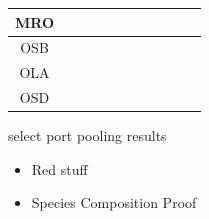 \documentclass[ xcolor = pdftex, dvipsnames, table ]{beamer}
\begin{document}
\begin{frame}
{\begin{tabular}{|c|c|c|c|c|c|c|c|c|c|c|}
        MRO&\cellcolor[HTML]{984EA3}&\cellcolor[HTML]{984EA3}&\cellcolor[HTML]{984EA3}&\cellcolor[HTML]{984EA3}&\cellcolor[HTML]{984EA3}&\cellcolor[HTML]{984EA3}&\cellcolor[HTML]{984EA3}&\cellcolor[HTML]{FF7F00}&\cellcolor[HTML]{984EA3}&\cellcolor[HTML]{984EA3} \\ \hline%
        OSB&\cellcolor[HTML]{FF7F00}&\cellcolor[HTML]{FF7F00}&\cellcolor[HTML]{FF7F00}&\cellcolor[HTML]{FF7F00}&\cellcolor[HTML]{FF7F00}&\cellcolor[HTML]{FF7F00}&\cellcolor[HTML]{FF7F00}&\cellcolor[HTML]{FF7F00}&\cellcolor[HTML]{984EA3}&\cellcolor[HTML]{FF7F00} \\ \hline%
        OLA&\cellcolor[HTML]{FF7F00}&\cellcolor[HTML]{FFFF33}&\cellcolor[HTML]{FF7F00}&\cellcolor[HTML]{FFFF33}&\cellcolor[HTML]{FF7F00}&\cellcolor[HTML]{FFFF33}&\cellcolor[HTML]{FFFF33}&\cellcolor[HTML]{FFFF33}&\cellcolor[HTML]{FF7F00}&\cellcolor[HTML]{FF7F00} \\ \hline%
        OSD&\cellcolor[HTML]{FF7F00}&\cellcolor[HTML]{FFFF33}&\cellcolor[HTML]{FFFF33}&\cellcolor[HTML]{A65628}&\cellcolor[HTML]{FFFF33}&\cellcolor[HTML]{FFFF33}&\cellcolor[HTML]{A65628}&\cellcolor[HTML]{FFFF33}&\cellcolor[HTML]{FFFF33}&\cellcolor[HTML]{FF7F00} \\ \hline%
\end{tabular}}
\end{frame}

%
%

\begin{frame}
\color{red} select port pooling results
\end{frame}

\begin{frame}
\begin{itemize}
\item {\color{red}Red stuff}
\item Species Composition Proof
\end{itemize}
\end{frame}


\end{document}
